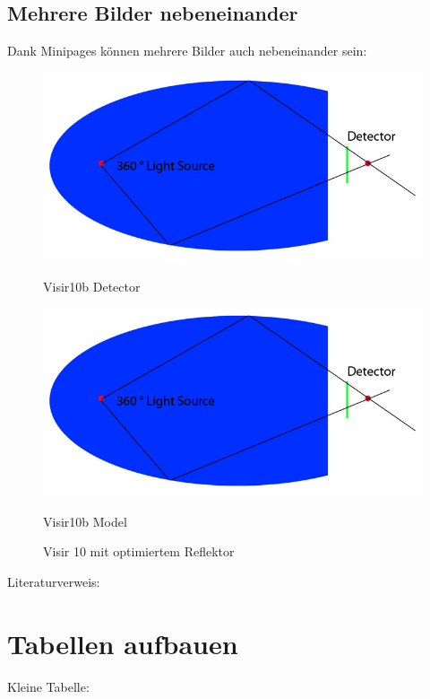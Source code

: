 \subsection{Mehrere Bilder nebeneinander}\label{nebeneinander}
Dank Minipages können mehrere Bilder auch nebeneinander sein:

\begin{figure}[H]
  \centering
  \begin{minipage}[b]{0.45\textwidth}
    \includegraphics[scale=0.15]{images/photoshop/Skizze.jpg}
    \caption{Visir10b Detector}
    \label{Visir10bDetector} 
  \end{minipage} %
  \begin{minipage}[b]{0.45\textwidth}
    \includegraphics[scale=0.15]{images/photoshop/Skizze.jpg} 
    \caption{Visir10b Model}
    \label{Visir10bModel} 
  \end{minipage}
  \caption{Visir 10 mit optimiertem Reflektor}
  \label{fig.Visir10b}
\end{figure}


Literaturverweis: \citep[S.21]{analog_devices_dac}

\section{Tabellen aufbauen}\label{tabelle}
Kleine Tabelle:

